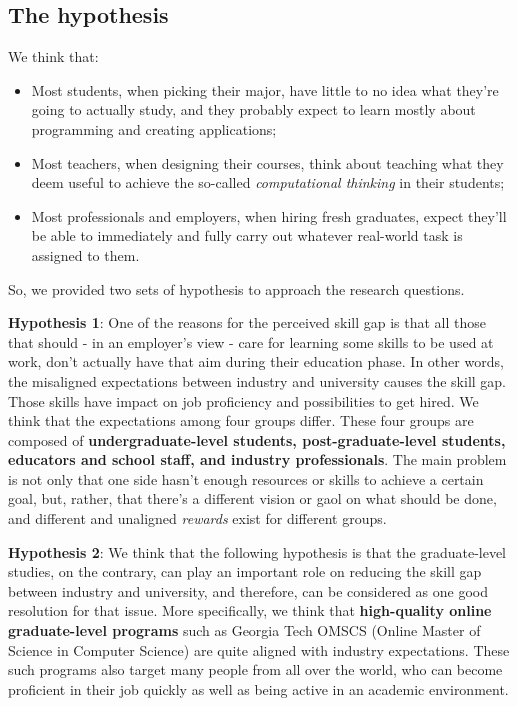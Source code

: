 \documentclass{sigchi}
\begin{document}
\subsection{The hypothesis}
We think that:
\begin{itemize}
\item Most students, when picking their major, have little to no idea what they're going to actually study, and they probably expect to learn mostly about programming and creating applications;
\item Most teachers, when designing their courses, think about teaching what they deem useful to achieve the so-called \textit{computational thinking} in their students;
\item Most professionals and employers, when hiring fresh graduates, expect they'll be able to immediately and fully carry out whatever real-world task is assigned to them.
\end{itemize}

So, we provided two sets of hypothesis to approach the research questions.

\textbf{Hypothesis 1}: One of the reasons for the perceived skill gap is that all those that should - in an employer's view - care for learning some skills to be used at work, don't actually have that aim during their education phase. In other words, the misaligned expectations between industry and university causes the skill gap. Those skills have impact on job proficiency and possibilities to get hired. We think that the expectations among four groups differ. These four groups are composed of \textbf{undergraduate-level students, post-graduate-level students, educators and school staff, and industry professionals}. The main problem is not only that one side hasn’t enough resources or skills to achieve a certain goal, but, rather, that there’s a different vision or gaol on what should be done, and different and unaligned \textit{rewards} exist for different groups.  

\textbf{Hypothesis 2}:  We think that the following hypothesis is that the graduate-level studies, on the contrary, can play an important role on reducing the skill gap between industry and university, and therefore, can be considered as one good resolution for that issue. More specifically, we think that \textbf{high-quality online graduate-level programs} such as Georgia Tech OMSCS (Online Master of Science in Computer Science) are quite aligned with industry expectations. These such programs also target many people from all over the world, who can become proficient in their job quickly as well as being active in an academic environment.
\end{document}
